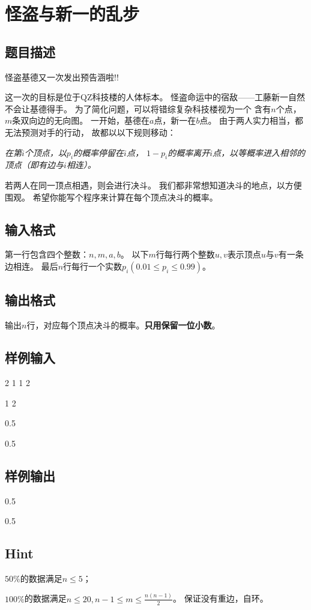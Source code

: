 \section{怪盗与新一的乱步}
\subsection{题目描述}
怪盗基德又一次发出预告涵啦!!\par
这一次的目标是位于QZ科技楼的人体标本。
怪盗命运中的宿敌——工藤新一自然不会让基德得手。
为了简化问题，可以将错综复杂科技楼视为一个
含有$n$个点，$m$条双向边的无向图。
一开始，基德在$a$点，新一在$b$点。
由于两人实力相当，都无法预测对手的行动，
故都以以下规则移动：
\par {\itshape 在第$i$个顶点，以$p_i$的概率停留在$i$点，
	$1-p_i$的概率离开$i$点，以等概率进入相邻的顶点（即有边与$i$相连）。}

	\par
	若两人在同一顶点相遇，则会进行决斗。
	我们都非常想知道决斗的地点，以方便围观。
	希望你能写个程序来计算在每个顶点决斗的概率。
\subsection{输入格式}
第一行包含四个整数：$n,m,a,b$。
以下$m$行每行两个整数$u,v$表示顶点$u$与$v$有一条边相连。
最后$n$行每行一个实数$p_i(0.01 \le p_i \le 0.99)$。
\subsection{输出格式}
输出$n$行，对应每个顶点决斗的概率。{\textbf{只用保留一位小数}}。
\subsection{样例输入}
2 1 1 2 \par
1 2 \par
0.5 \par
0.5
\subsection{样例输出}
0.5 \par
0.5
\subsection{Hint}
\par
$50\%$的数据满足$n \le 5$；
\par
$100\%$的数据满足$n \le 20, n - 1 \le m \le \frac{n(n-1)}{2}$。
保证没有重边，自环。
